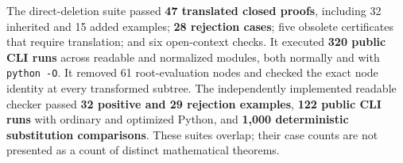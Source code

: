 The direct-deletion suite passed \textbf{47 translated closed proofs},
including 32 inherited and 15 added examples; \textbf{28 rejection cases};
five obsolete certificates that require translation; and six open-context
checks. It executed \textbf{320 public CLI runs} across readable and
normalized modules, both normally and with \texttt{python -O}. It removed
61 root-evaluation nodes and checked the exact node identity at every
transformed subtree. The independently implemented readable checker passed
\textbf{32 positive and 29 rejection examples}, \textbf{122 public CLI runs}
with ordinary and optimized Python, and \textbf{1,000 deterministic
substitution comparisons}. These suites overlap; their case counts are
not presented as a count of distinct mathematical theorems.
